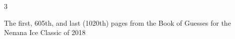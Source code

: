 \documentclass[landscape,7pt]{article}
\begin{document}
\begin{multicols}{2}


\end{multicols}{3}

\newpage


\begin{multicols}{3}




\end{multicols}
{ \Large The first, 605th, and last (1020th) pages from the Book of Guesses for the Nenana Ice Classic of 2018}

\newpage
\end{document}
